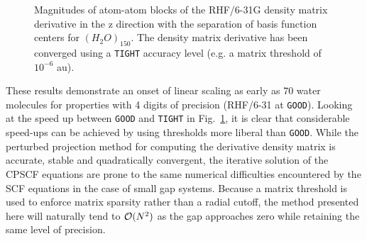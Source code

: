 \documentclass[prl,aps,twocolumn,showpacs,twocolumngrid,superbib]{revtex4}
\begin{document}
\begin{figure}
  \caption{\protect
    Magnitudes of atom-atom blocks of the RHF/6-31G density matrix derivative
    in the z direction with the separation of basis function centers for $(H_2O)_{150}$.
    The density matrix derivative has been converged using a {\tt TIGHT} accuracy level (e.g. 
    a matrix threshold of $10^{-6}$ au).
  }\label{fig:DPrimeZ_150_6-31G}
\end{figure}

These results demonstrate an onset of linear scaling as early as 70 water molecules
for properties with 4 digits of precision (RHF/6-31 at {\tt GOOD}). Looking at the
speed up between {\tt GOOD} and {\tt TIGHT} in Fig.~\ref{fig:DPrimeZ_150_6-31G}, it is clear
that considerable speed-ups can be achieved by using thresholds more liberal than 
{\tt GOOD}.  While the perturbed projection method for computing the derivative density matrix is 
accurate, stable and quadratically convergent, the iterative solution of the CPSCF 
equations are prone to the same numerical difficulties encountered by the SCF equations 
in the case of small gap systems.  Because a matrix threshold is used to enforce matrix
sparsity rather than a radial cutoff, the method presented here will naturally tend to 
${\cal O}(N^2)$ as the gap approaches zero while retaining the same level of precision.
\end{document}
